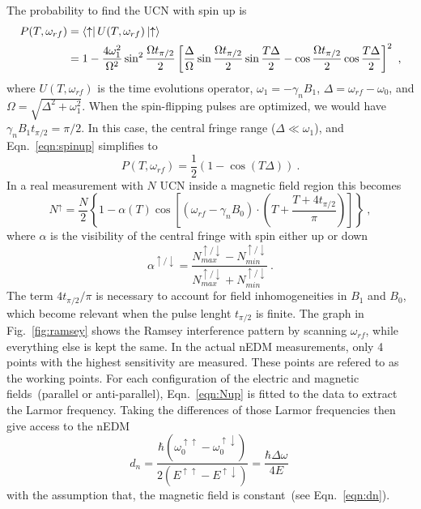 The probability to find the UCN with spin up is
\begin{align}
  \label{eqn:spinup}
  P(T, \omega_{rf}) &= \bra{\uparrow} U(T, \omega_{rf}) \ket{\uparrow} \\ \nonumber
  &= 1 - \frac{4 \omega_1^2}{\Omega^2} \sin ^2 \frac{\Omega t_{\pi/2}}{2} \left[ \frac{\Delta}{\Omega} \sin  \frac{\Omega t_{\pi/2}}{2} \sin \frac{T\Delta}{2} - \cos  \frac{\Omega t_{\pi/2}}{2} \cos\frac{T\Delta}{2} \right]^2~,
\end{align}
where $U(T, \omega_{rf})$ is the time evolutions operator,
$\omega_1 = - \gamma_n B_1$, $\Delta = \omega_{rf} - \omega_0$, and
$\Omega = \sqrt{\Delta^2 + \omega_1^2}$. When the spin-flipping pulses
are optimized, we would have $\gamma_n B_1 t_{\pi/2} = \pi / 2$. In
this case, the central fringe range ($\Delta \ll \omega_1$), and
Eqn.~\ref{eqn:spinup} simplifies to
\begin{equation}
  P(T, \omega_{rf}) = \frac{1}{2} \left( 1 - \cos(T\Delta) \right)~.
\end{equation}
In a real measurement with $N$ UCN inside a magnetic field region this
becomes
\begin{equation}
  \label{eqn:Nup}
N^{\uparrow} = \frac{N}{2} \left\lbrace 1 - \alpha(T) \cos \left[ (\omega_{rf} - \gamma_n B_0 ) \cdot \left(T+\frac{T+4t_{\pi/2}}{\pi}\right)\right]\right\rbrace~,
\end{equation}
where $\alpha$ is the visibility of the central fringe with spin
either up or down
\begin{equation}
  \label{eqn:visibility}
  \alpha^{\uparrow /\downarrow} = \frac{N_{max}^{\uparrow /\downarrow} - N_{min}^{\uparrow /\downarrow}}{N_{max}^{\uparrow /\downarrow}+ N_{min}^{\uparrow /\downarrow}}~.
\end{equation}
The term $4t_{\pi/2}/\pi$ is necessary to account for field
inhomogeneities in $B_1$ and $B_0$, which become relevant when the
pulse lenght $t_{\pi/2}$ is finite. The graph in Fig.~\ref{fig:ramsey}
shows the Ramsey interference pattern by scanning $\omega_{rf}$, while
everything else is kept the same. In the actual nEDM measurements, only 4
points with the highest sensitivity are measured. These points are
refered to as the working points. For each configuration of the
electric and magnetic fields~(parallel or anti-parallel),
Eqn.~\ref{eqn:Nup} is fitted to the data to extract the Larmor
frequency. Taking the differences of those Larmor frequencies then
give access to the nEDM
\begin{equation}
  \label{eqn:fitteddn}
  d_n = \frac{\hbar (\omega_0 ^{\uparrow \uparrow} - \omega_0 ^{\uparrow \downarrow})}{2(E^{\uparrow \uparrow} - E^{\uparrow \downarrow})} = \frac{\hbar \Delta \omega}{4E}~
\end{equation}
with the assumption that, the magnetic field is constant~(see
Eqn.~\ref{eqn:dn}).


